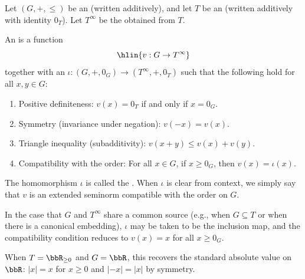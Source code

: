 \begin{definition} \label{definition:extended_seminorm_compatible_with_the_order_on_an_ordered_abelian_group_valued_in_an_ordered_commutative_monoid_with_adjoined_infinity}
    Let $(G, +, \leq)$ be an  (written additively), and let $T$ be an  (written additively with identity $0_T$). Let $T^\infty$ be the  obtained from $T$.

    An  is a function
    $$\hlin{v : G \to T^\infty}$$
    together with an  $\iota : (G, +, 0_G) \to (T^\infty, +, 0_T)$ such that the following hold for all $x, y \in G$:
    \begin{enumerate}
        \item Positive definiteness: $v(x) = 0_T$ if and only if $x = 0_G$.
        \item Symmetry (invariance under negation): $v(-x) = v(x)$.
        \item Triangle inequality (subadditivity): $v(x + y) \leq v(x) + v(y)$.
        \item Compatibility with the order: For all $x \in G$, if $x \geq 0_G$, then $v(x) = \iota(x)$.
    \end{enumerate}

    The homomorphism $\iota$ is called the . When $\iota$ is clear from context, we simply say that $v$ is an extended seminorm compatible with the order on $G$.

    In the case that $G$ and $T^\infty$ share a common source (e.g., when $G \subseteq T$ or when there is a canonical embedding), $\iota$ may be taken to be the inclusion map, and the compatibility condition reduces to $v(x) = x$ for all $x \geq 0_G$.

    When $T = \bbR_{\ge 0}$ and $G = \bbR$, this recovers the standard absolute value on $\bbR$: $|x| = x$ for $x \geq 0$ and $|-x| = |x|$ by symmetry.
\end{definition}
